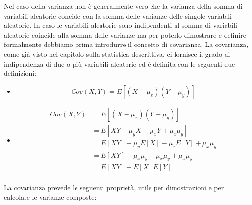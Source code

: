 \documentclass[a4paper,12pt, oneside]{book}
\begin{document}
Nel caso della varianza non è generalmente vero che la varianza della somma di variabili aleatorie concide con la 
somma delle varianze delle singole variabili aleatorie.\newline
In caso le variabili aleatorie sono indipendenti al somma di variabili aleatorie coincide alla somma delle varianze
ma per poterlo dimostrare e definire formalmente dobbiamo prima introdurre il concetto di covarianza.\newline
La covarianza, come già visto nel capitolo sulla statistica descrittiva, ci fornisce il grado di indipendenza di
due o più variabili aleatorie ed è definita con le seguenti due definizioni:
\begin{itemize}
    \item \[ Cov(X, Y) = E[(X - \mu_x) (Y - \mu_y)] \]
    \item \[ \begin{split}
             Cov(X, Y) & = E[(X - \mu_x)(Y - \mu_y)] \\
                       & = E[XY - \mu_yX - \mu_xY + \mu_x\mu_y] \\
                       & = E[XY] -\mu_yE[X] - \mu_xE[Y] + \mu_x\mu_y\\
                       & = E[XY] -\mu_x\mu_y - \mu_x\mu_y + \mu_x\mu_y \\
                       & = E[XY] - E[X]E[Y]\\
            \end{split} \]
\end{itemize}
La covarianza prevede le seguenti proprietà, utile per dimostrazioni e per calcolare le varianze composte:
\end{document}
